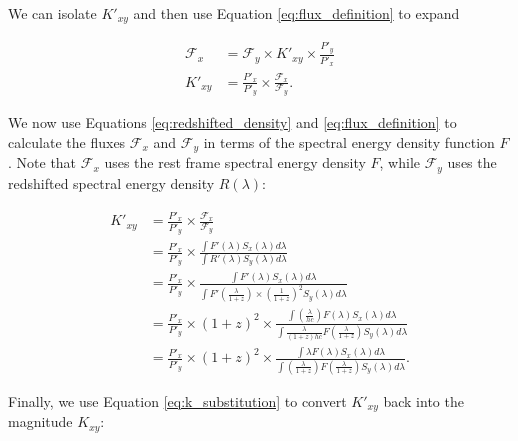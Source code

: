 \documentclass[aps,prl,reprint,amsmath,floatfix]{revtex4-2}
\begin{document}
\noindent We can isolate $K'_{xy}$ and then use Equation \ref{eq:flux_definition} to expand

\begin{equation}
\begin{aligned}
  \mathcal{F}_x &= \mathcal{F}_y \times K'_{xy} \times \frac{P'_y}{P'_x} \\
        K'_{xy} &= \frac{P'_x}{P'_y} \times \frac{\mathcal{F}_x}{\mathcal{F}_y} .
\end{aligned}
\end{equation}

\noindent We now use Equations \ref{eq:redshifted_density} and \ref{eq:flux_definition}
to calculate the fluxes $\mathcal{F}_x$ and $\mathcal{F}_y$ in terms of the
spectral energy density function $F$. Note that $\mathcal{F}_x$ uses the rest
frame spectral energy density $F$, while $\mathcal{F}_y$ uses the redshifted
spectral energy density $R(\lambda)$:

\begin{equation}
\begin{aligned}
  K'_{xy} &= \frac{P'_x}{P'_y} \times \frac{\mathcal{F}_x}{\mathcal{F}_y} \\
          &= \frac{P'_x}{P'_y} \times
              \frac{\int F'(\lambda) S_x(\lambda) d\lambda}
                   {\int R'(\lambda) S_y(\lambda) d\lambda} \\
          &= \frac{P'_x}{P'_y} \times
              \frac{\int F'(\lambda) S_x(\lambda) d\lambda}
                   {\int F'\left(\frac{\lambda}{1+z}\right) \times \left(\frac{1}{1 + z}\right)^2 S_y(\lambda) d\lambda} \\
          &= \frac{P'_x}{P'_y} \times (1+z)^2 \times
              \frac{\int \left(\frac{\lambda}{hc}\right) F(\lambda) S_x(\lambda) d\lambda}
                   {\int \frac{\lambda}{(1+z)hc} F\left(\frac{\lambda}{1+z}\right) S_y(\lambda) d\lambda} \\
          &= \frac{P'_x}{P'_y} \times (1 + z)^2 \times
              \frac{\int \lambda F(\lambda) S_x(\lambda) d\lambda}
                   {\int \left(\frac{\lambda}{1+z}\right) F\left(\frac{\lambda}{1+z}\right) S_y(\lambda) d\lambda} .
\end{aligned}
\end{equation}

Finally, we use Equation \ref{eq:k_substitution} to convert $K'_{xy}$ back into
the magnitude $K_{xy}$:
\end{document}
